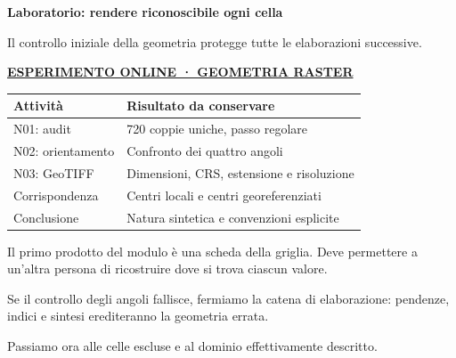 \documentclass[12pt,aspectratio=1610]{beamer}
\newcommand{\PBody}[1]{\par{\fontsize{11.3}{14.8}\selectfont #1\par}}
\newcommand{\PSmall}[1]{\par{\fontsize{9.8}{13.1}\selectfont #1\par}}
\newcommand{\PInfo}[1]{%
\begin{tcolorbox}[enhanced,arc=1.6mm,boxrule=.55pt,colback=GeoTint,
 colframe=Rule!80!Classical,left=2.3mm,right=2.3mm,top=2mm,bottom=2mm,
 before skip=1mm,after skip=1mm]
\PSmall{#1}\end{tcolorbox}}
\newcommand{\PLab}[2]{\par{\color{Classical}\bfseries\fontsize{9}{11}\selectfont
\href{#1}{\MakeUppercase{#2}}}\par\vspace{1.8mm}}
\begin{document}
\begin{frame}[plain]\hypertarget{slide19}{}
\begin{lrbox}{\TitleBox}
\begin{minipage}[t]{17.7cm}\raggedright\color{Ink}\fontsize{11.3}{14.8}\selectfont
\color{Navy}\bfseries\fontsize{20.6}{24.5}\selectfont Laboratorio: rendere riconoscibile ogni cella
\end{minipage}\end{lrbox}

\begin{lrbox}{\RecallBox}
\begin{minipage}[t]{14.3cm}\raggedright\color{Ink}\fontsize{11.3}{14.8}\selectfont
\fontsize{10.3}{13.8}\selectfont Il controllo iniziale della geometria protegge tutte le elaborazioni successive.
\end{minipage}\end{lrbox}

\begin{lrbox}{\PilotLeftBox}
\begin{minipage}[t]{10.05cm}\raggedright\color{Ink}\fontsize{11.3}{14.8}\selectfont
\PLab{https://marzione00.github.io/Lab_Geo/\#laboratorio/m12-griglia}{Esperimento online · geometria raster}
{\fontsize{10.2}{13.1}\selectfont\renewcommand{\arraystretch}{1.45}\begin{tabular}{@{}p{4.2cm}p{4.8cm}@{}}\toprule
\textbf{Attività} & \textbf{Risultato da conservare}\\\midrule
N01: audit & 720 coppie uniche, passo regolare\\
N02: orientamento & Confronto dei quattro angoli\\
N03: GeoTIFF & Dimensioni, CRS, estensione e risoluzione\\
Corrispondenza & Centri locali e centri georeferenziati\\
Conclusione & Natura sintetica e convenzioni esplicite\\
\bottomrule\end{tabular}}

\end{minipage}\end{lrbox}

\begin{lrbox}{\PilotRightBox}
\begin{minipage}[t]{7.55cm}\raggedright\color{Ink}\fontsize{11.3}{14.8}\selectfont
\PBody{Il primo prodotto del modulo è una scheda della griglia. Deve permettere a un’altra persona di ricostruire dove si trova ciascun valore.}
\vspace{2.5mm}
\PInfo{Se il controllo degli angoli fallisce, fermiamo la catena di elaborazione: pendenze, indici e sintesi erediteranno la geometria errata.}
\PBody{Passiamo ora alle celle escluse e al dominio effettivamente descritto.}
\vspace{2.5mm}


\end{minipage}
\end{lrbox}
\end{frame}
\end{document}

